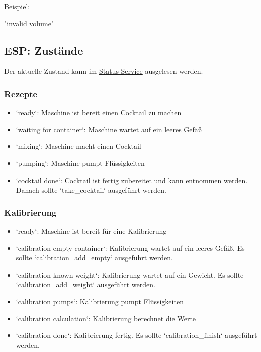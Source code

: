 	Beispiel:
	

	"invalid volume"
	


\subsection{ESP: Zustände}		
\label{sec:status}
	
Der aktuelle Zustand kann im \hyperref[sec:espbefehle]{Status-Service} ausgelesen werden. 
	
\subsubsection{Rezepte}
\label{sec:statusrez}
	\begin{itemize}	
		\item `ready`: Maschine ist bereit einen Cocktail zu machen
		\item `waiting for container`: Maschine wartet auf ein leeres Gefäß
		\item `mixing`: Maschine macht einen Cocktail
		\item `pumping`: Maschine pumpt Flüssigkeiten
		\item `cocktail done`: Cocktail ist fertig zubereitet und kann entnommen werden. Danach sollte `take\_cocktail` ausgeführt werden.
	\end{itemize}
\subsubsection{ Kalibrierung}
\label{sec:statuscal}
	\begin{itemize}
		\item `ready`: Maschine ist bereit für eine Kalibrierung
		\item `calibration empty container`: Kalibrierung wartet auf ein leeres Gefäß. Es sollte `calibration\_add\_empty` ausgeführt werden.
		\item `calibration known weight`: Kalibrierung wartet auf ein Gewicht. Es sollte `calibration\_add\_weight` ausgeführt werden.
		\item `calibration pumps`: Kalibrierung pumpt Flüssigkeiten
		\item `calibration calculation`: Kalibrierung berechnet die Werte
		\item `calibration done`: Kalibrierung fertig. Es sollte `calibration\_finish` ausgeführt werden.
	\end{itemize}
